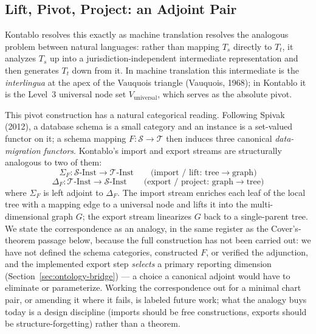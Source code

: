 \subsection{Lift, Pivot, Project: an Adjoint Pair}
Kontablo resolves this exactly as machine translation resolves the analogous problem between
natural languages: rather than mapping $T_s$ directly to $T_t$, it analyzes $T_s$ up into a
jurisdiction-independent intermediate representation and then generates $T_t$ down from it.
In machine translation this intermediate is the \textit{interlingua} at the apex of the
Vauquois triangle (Vauquois, 1968); in Kontablo it is the Level~3 universal node set
$V_{\text{universal}}$, which serves as the absolute pivot.

This pivot construction has a natural categorical reading. Following Spivak (2012), a
database schema is a small category and an instance is a set-valued functor on it; a schema
mapping $F: \mathcal{S} \rightarrow \mathcal{T}$ then induces three canonical
\emph{data-migration functors}. Kontablo's import and export streams are structurally
analogous to two of them:
\[
\Sigma_F : \mathcal{S}\text{-Inst} \rightarrow \mathcal{T}\text{-Inst}
\qquad\text{(import / lift: tree}\rightarrow\text{graph)}
\]
\[
\Delta_F : \mathcal{T}\text{-Inst} \rightarrow \mathcal{S}\text{-Inst}
\qquad\text{(export / project: graph}\rightarrow\text{tree)}
\]
where $\Sigma_F$ is left adjoint to $\Delta_F$. The import stream enriches each leaf of the
local tree with a mapping edge to a universal node and lifts it into the multi-dimensional
graph $G$; the export stream linearizes $G$ back to a single-parent tree. We state the
correspondence as an analogy, in the same register as the Cover's-theorem passage below,
because the full construction has not been carried out: we have not defined the schema
categories, constructed $F$, or verified the adjunction, and the implemented export step
\emph{selects} a primary reporting dimension (Section~\ref{sec:ontology-bridge}) --- a
choice a canonical adjoint would have to eliminate or parameterize. Working the
correspondence out for a minimal chart pair, or amending it where it fails, is labeled
future work; what the analogy buys today is a design discipline (imports should be free
constructions, exports should be structure-forgetting) rather than a theorem.


